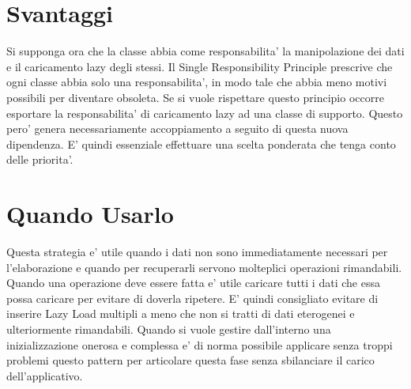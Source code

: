 \section{Svantaggi}

Si supponga ora che la classe abbia come responsabilita' la manipolazione dei dati e il caricamento lazy degli stessi.
Il Single Responsibility Principle prescrive che ogni classe abbia solo una responsabilita', in modo tale che abbia meno motivi possibili per diventare obsoleta.
Se si vuole rispettare questo principio occorre esportare la responsabilita' di caricamento lazy ad una classe di supporto.
Questo pero' genera necessariamente accoppiamento a seguito di questa nuova dipendenza.
E' quindi essenziale effettuare una scelta ponderata che tenga conto delle priorita'.

\section{Quando Usarlo}

Questa strategia e' utile quando i dati non sono immediatamente necessari per l'elaborazione e quando per recuperarli servono molteplici operazioni rimandabili.
Quando una operazione deve essere fatta e' utile caricare tutti i dati che essa possa caricare per evitare di doverla ripetere. E' quindi consigliato evitare di inserire Lazy Load multipli a meno che non si tratti di dati eterogenei e ulteriormente rimandabili.
Quando si vuole gestire dall'interno una inizializzazione onerosa e complessa e' di norma possibile applicare senza troppi problemi questo pattern per articolare questa fase senza sbilanciare il carico dell'applicativo.